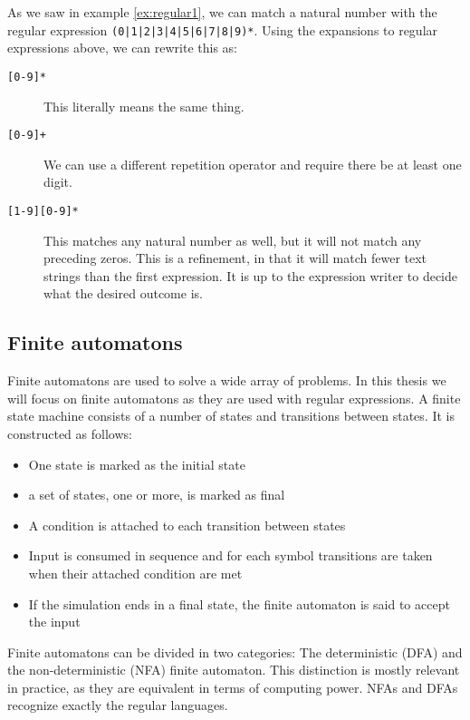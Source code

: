 \begin{example}

As we saw in example \ref{ex:regular1}, we can match a natural number
with the regular expression \texttt{(0|1|2|3|4|5|6|7|8|9)*}. Using the
expansions to regular expressions above, we can rewrite this as:
\begin{description}
\item[\texttt{[0-9]*}] This literally means the same thing.
\item[\texttt{[0-9]+}] We can use a different repetition operator and
  require there be at least one digit.
\item[\texttt{[1-9][0-9]*}] This matches any natural number as
  well, but it will not match any preceding zeros. This is a
  refinement, in that it will match fewer text strings than the first
  expression. It is up to the expression writer to decide what the desired outcome is.
\end{description}
\end{example}


\subsection{Finite automatons}

Finite automatons are used to solve a wide array of problems. In this
thesis we will focus on finite automatons as they are used with
regular expressions. 
A finite state machine consists of a number of
states and transitions between states. It is constructed as follows:
\begin{itemize}
    \item One state is marked as the
    initial state
    \item a set of states, one or more, is marked as final
    \item A condition is attached to each transition between states
    \item Input is consumed in sequence and for each symbol transitions are taken when their attached condition are met
    \item If the simulation ends in a final state, the finite automaton is said to accept the input
\end{itemize}

Finite automatons can be divided in two categories: The deterministic
(DFA) and the non-deterministic (NFA) finite automaton. This
distinction is mostly relevant in practice, as they are equivalent in
terms of computing power. NFAs and DFAs recognize exactly the regular
languages.


